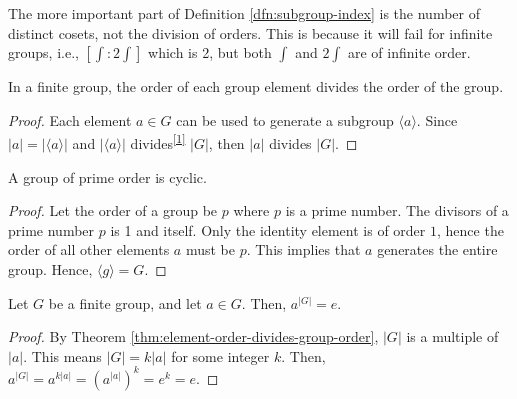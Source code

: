     \begin{note}
        The more important part of Definition \ref{dfn:subgroup-index} is the number of distinct cosets, not the division of orders. This is because it will fail for infinite groups, i.e., \([\int : 2\int]\) which is 2, but both \(\int\) and \(2\int\) are of infinite order.
    \end{note}

    \begin{thm}
        In a finite group, the order of each group element divides the order of the group.
    \end{thm}

    \begin{proof}
        Each element \(a\in G\) can be used to generate a subgroup \(\langle a\rangle\). Since \(|a| = |\langle a \rangle|\) and \(|\langle a \rangle|\) divides\textsuperscript{\hyperref[cor:same-order-element-generator]{[1]}} \(|G|\), then \(|a|\) divides \(|G|\).
    \end{proof}

    \begin{thm}
        A group of prime order is cyclic.
    \end{thm}

    \begin{proof}
        Let the order of a group be \(p\) where \(p\) is a prime number. The divisors of a prime number \(p\) is 1 and itself. Only the identity element is of order \(1\), hence the order of all other elements \(a\) must be \(p\). This implies that \(a\) generates the entire group. Hence, \(\langle g\rangle = G\).
    \end{proof}

    \begin{thm}
        Let \(G\) be a finite group, and let \(a \in G\). Then, \(a^{|G|} = e\).
    \end{thm}

    \begin{proof}
        By Theorem \ref{thm:element-order-divides-group-order}, \(|G|\) is a multiple of \(|a|\). This means \(|G| = k|a|\) for some integer \(k\). Then, \(a^{|G|} = a^{k|a|} = (a^{|a|})^k = e^k = e\).
    \end{proof}